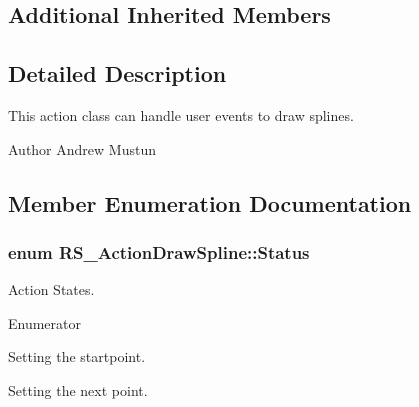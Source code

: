 \subsection*{Additional Inherited Members}


\subsection{Detailed Description}
This action class can handle user events to draw splines.

\begin{DoxyAuthor}{Author}
Andrew Mustun 
\end{DoxyAuthor}


\subsection{Member Enumeration Documentation}
\hypertarget{classRS__ActionDrawSpline_a8a6521c7221c3ad38a05f50b1662739e}{
\subsubsection[{Status}]{\setlength{\rightskip}{0pt plus 5cm}enum {\bf R\-S\-\_\-\-Action\-Draw\-Spline\-::\-Status}}}\label{classRS__ActionDrawSpline_a8a6521c7221c3ad38a05f50b1662739e}
Action States. \begin{Desc}
\item[Enumerator]\par
\begin{description}
\item[{\em 
\hypertarget{classRS__ActionDrawSpline_a8a6521c7221c3ad38a05f50b1662739ea2744693d5ef099e38014470cb2201d1a}{Set\-Startpoint}\label{classRS__ActionDrawSpline_a8a6521c7221c3ad38a05f50b1662739ea2744693d5ef099e38014470cb2201d1a}
}]Setting the startpoint. \item[{\em 
\hypertarget{classRS__ActionDrawSpline_a8a6521c7221c3ad38a05f50b1662739ea88bd07f275c3c409ecc9b9612765eb65}{Set\-Next\-Point}\label{classRS__ActionDrawSpline_a8a6521c7221c3ad38a05f50b1662739ea88bd07f275c3c409ecc9b9612765eb65}
}]Setting the next point. \end{description}
\end{Desc}


